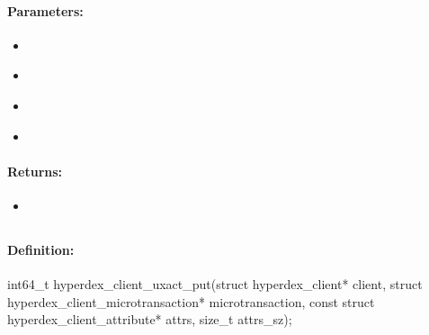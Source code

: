 \paragraph{Parameters:}
\begin{itemize}[noitemsep]
\item {}\\

\item {}\\

\item {}\\

\item {}\\

\end{itemize}

\paragraph{Returns:}
\begin{itemize}[noitemsep]
\item {}\\

\end{itemize}

\pagebreak
\subsection{}
\label{api:c:uxact_put}


\paragraph{Definition:}
\begin{ccode}
int64_t hyperdex_client_uxact_put(struct hyperdex_client* client,
        struct hyperdex_client_microtransaction* microtransaction,
        const struct hyperdex_client_attribute* attrs, size_t attrs_sz);
\end{ccode}

